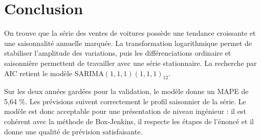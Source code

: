 \documentclass[12pt,a4paper]{article}
\begin{document}
\section{Conclusion}

On trouve que la série des ventes de voitures possède une tendance croissante
et une saisonnalité annuelle marquée. La transformation logarithmique permet de
stabiliser l'amplitude des variations, puis les différenciations ordinaire et
saisonnière permettent de travailler avec une série stationnaire. La recherche par AIC
retient le modèle SARIMA$(1,1,1)(1,1,1)_{12}$.

Sur les deux années gardées pour la validation, le modèle donne un MAPE de 5,64 \%.
Les prévisions suivent correctement le profil saisonnier de la série. Le modèle est
donc acceptable pour une présentation de niveau ingénieur : il est cohérent avec la
méthode de Box-Jenkins, il respecte les étapes de l'énoncé et il donne une qualité de
prévision satisfaisante.
\end{document}
